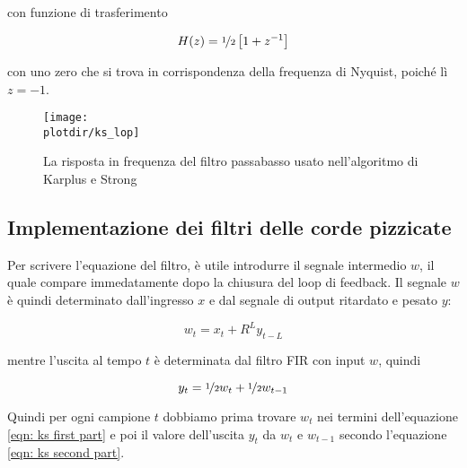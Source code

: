 con funzione di trasferimento

\begin{equation}\label{eqn: ks lop transfer function}
				H (z) = \nicefrac{1}{2} \left [ 1 + z^{-1} \right ]
\end{equation}

con uno zero che si trova in corrispondenza della frequenza di Nyquist,
poich\'e l\`i $z = -1$.
% 

\begin{figure}[htbp]
	\begin{center}
		\texttt{[image: \\plotdir/ks\_lop]}
		\caption{La risposta in frequenza del filtro passabasso usato
		nell'algoritmo di Karplus e Strong\label{fig:ks lop frequency response}}
	\end{center}
\end{figure}

\subsection{Implementazione dei filtri delle corde pizzicate}

Per scrivere l'equazione del filtro,
\`e utile introdurre il segnale intermedio $w$,
il quale compare immedatamente dopo la chiusura del loop di feedback.
Il segnale $w$ \`e quindi determinato dall'ingresso $x$ e dal segnale di
output ritardato e pesato $y$:

\begin{equation}\label{eqn: ks first part}
				w_t = x_t + R^{L} y_{t-L}
\end{equation}

mentre l'uscita al tempo $t$ \`e determinata dal filtro FIR con input $w$,
quindi

\begin{equation}\label{eqn: ks second part}
				y_t = \nicefrac{1}{2} w_t + \nicefrac{1}{2} w_{t - 1}
\end{equation}

Quindi per ogni campione $t$ dobbiamo prima trovare $w_t$ nei termini
dell'equazione \ref{eqn: ks first part} e poi il valore dell'uscita $y_t$ da
$w_t$ e $w_{t - 1}$ secondo l'equazione \ref{eqn: ks second part}.

